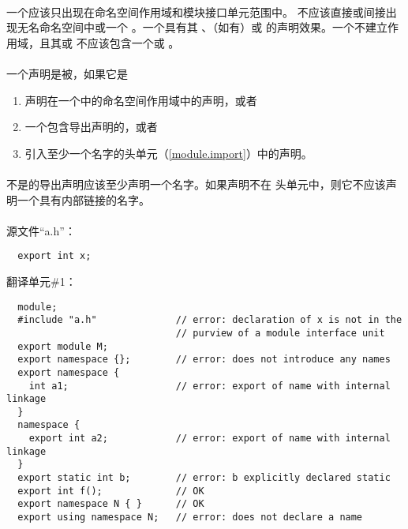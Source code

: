 
\paragraph{} %
一个应该只出现在命名空间作用域和模块接口单元范围中。
不应该直接或间接出现无名命名空间中或一个
。一个具有其
、（如有）或
的声明效果。一个不建立作用域，且其或
不应该包含一个或
。

\paragraph{} %
一个声明是被，如果它是
\begin{enumerate}
  \item 声明在一个中的命名空间作用域中的声明，或者
  \item 一个包含导出声明的，或者
  \item 引入至少一个名字的头单元（\ref{module.import}）中的声明。
\end{enumerate}

\paragraph{} %
不是的导出声明应该至少声明一个名字。如果声明不在
头单元中，则它不应该声明一个具有内部链接的名字。

\paragraph{} %
\begin{example}

  源文件“a.h”：
  \begin{lstlisting}
  export int x;
  \end{lstlisting}
  翻译单元\#1：
  \begin{lstlisting}
  module;
  #include "a.h"              // error: declaration of x is not in the
                              // purview of a module interface unit
  export module M;
  export namespace {};        // error: does not introduce any names
  export namespace {
    int a1;                   // error: export of name with internal linkage
  }
  namespace {
    export int a2;            // error: export of name with internal linkage
  }
  export static int b;        // error: b explicitly declared static
  export int f();             // OK
  export namespace N { }      // OK
  export using namespace N;   // error: does not declare a name
  \end{lstlisting}
\end{example}

